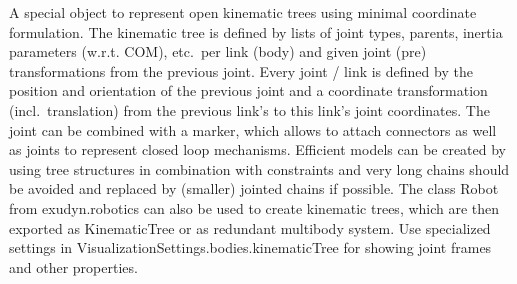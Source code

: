 \label{sec:item:ObjectKinematicTree}
A special object to represent open kinematic trees using minimal coordinate formulation. The kinematic tree is defined by lists of joint types, parents, inertia parameters (w.r.t. COM), etc.\ per link (body) and given joint (pre) transformations from the previous joint. Every joint / link is defined by the position and orientation of the previous joint and a coordinate transformation (incl.\ translation) from the previous link's to this link's joint coordinates. The joint can be combined with a marker, which allows to attach connectors as well as joints to represent closed loop mechanisms. Efficient models can be created by using tree structures in combination with constraints and very long chains should be avoided and replaced by (smaller) jointed chains if possible. The class Robot from exudyn.robotics can also be used to create kinematic trees, which are then exported as KinematicTree or as redundant multibody system. Use specialized settings in VisualizationSettings.bodies.kinematicTree for showing joint frames and other properties.
\vspace{12pt}\\

